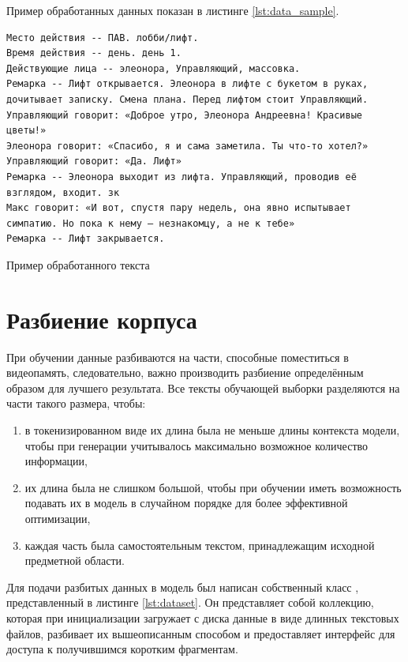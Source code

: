 Пример обработанных данных показан в листинге \ref*{lst:data_sample}.

\begin{listing}[H]
\begin{verbatim}
Место действия -- ПАВ. лобби/лифт. 
Время действия -- день. день 1. 
Действующие лица -- элеонора, Управляющий, массовка. 
Ремарка -- Лифт открывается. Элеонора в лифте с букетом в руках,
дочитывает записку. Смена плана. Перед лифтом стоит Управляющий. 
Управляющий говорит: «Доброе утро, Элеонора Андреевна! Красивые
цветы!»
Элеонора говорит: «Спасибо, я и сама заметила. Ты что-то хотел?» 
Управляющий говорит: «Да. Лифт» 
Ремарка -- Элеонора выходит из лифта. Управляющий, проводив её
взглядом, входит. зк 
Макс говорит: «И вот, спустя пару недель, она явно испытывает
симпатию. Но пока к нему – незнакомцу, а не к тебе» 
Ремарка -- Лифт закрывается. 
\end{verbatim}
\caption{Пример обработанного текста}
\label{lst:data_sample}
\end{listing}

\section{Разбиение корпуса}

При обучении данные разбиваются на части, способные поместиться в видеопамять, следовательно, важно производить разбиение определённым образом для лучшего результата. Все тексты обучающей выборки разделяются на части такого размера, чтобы:
\begin{enumerate}
    \item в токенизированном виде их длина была не меньше длины контекста модели, чтобы при генерации учитывалось максимально возможное количество информации,
    \item их длина была не слишком большой, чтобы при обучении иметь возможность подавать их в модель в случайном порядке для более эффективной оптимизации,
    \item каждая часть была самостоятельным текстом, принадлежащим исходной предметной области.
\end{enumerate}

Для подачи разбитых данных в модель был написан собственный класс , представленный в листинге \ref*{lst:dataset}. Он представляет собой коллекцию, которая при инициализации загружает с диска данные в виде длинных текстовых файлов, разбивает их вышеописанным способом и предоставляет интерфейс для доступа к получившимся коротким фрагментам.

